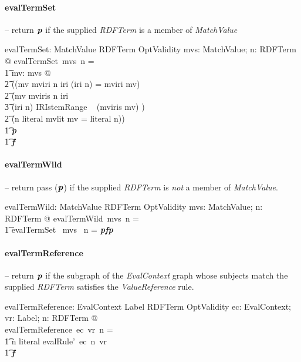 \documentclass[fuzz]{llncs}
\def\entryFor{\cdot}
\def\pass{\textbf{\textit{p}}}
\def\fail{\textbf{\textit{f}}}
\def\zc{\textit}
\begin{document}
\paragraph{evalTermSet} -- return $\pass$ if the supplied \zc{RDFTerm} is a member of \zc{MatchValue}
\begin{gendef}
   evalTermSet: \power MatchValue \pfun RDFTerm \pfun OptValidity
\where
   \forall mvs: \power MatchValue; n: RDFTerm @ evalTermSet~mvs~n = \\
\t1	\IF \exists mv: mvs @ \\
\t2 ((mv \in \ran mviri \land n \in \ran iri \land (iri \entryFor n) = mviri \entryFor mv) \lor \\
\t2  (mv \in \ran mviris \land n \in \ran iri \land  \\
\t3 (iri \entryFor n) \in IRIstemRange ~ (mviris \entryFor mv) ) \lor \\
\t2  (n \in \ran literal \land mvlit \entryFor mv = literal \entryFor n)) \\
\t1 \THEN \pass \\
\t1 \ELSE \fail
\end{gendef}


\paragraph{evalTermWild} -- return pass ($\pass$) if the supplied \zc{RDFTerm} is \textit{not} a member of \zc{MatchValue}.

\begin{gendef}
   evalTermWild: \power MatchValue \fun RDFTerm \fun OptValidity
\where
   \forall mvs: \power MatchValue; n: RDFTerm @ evalTermWild~mvs~n = \\
\t1 \IF evalTermSet~ mvs~ n = \pass \THEN \fail \ELSE \pass
\end{gendef}

\paragraph{evalTermReference} -- return $\pass$ if the subgraph of the \zc{EvalContext} graph whose subjects match the supplied \zc{RDFTerm} satisfies the \zc{ValueReference} rule.

\begin{gendef}
   evalTermReference: EvalContext \pfun Label \pfun RDFTerm \pfun OptValidity
\where
	\forall ec: EvalContext; vr: Label; n: RDFTerm @ \\ evalTermReference~ec~vr~n = \\
\t1 \IF n \notin \ran literal \THEN evalRule'~ec~n~vr \\
\t1 \ELSE \fail
\end{gendef}
\end{document}
